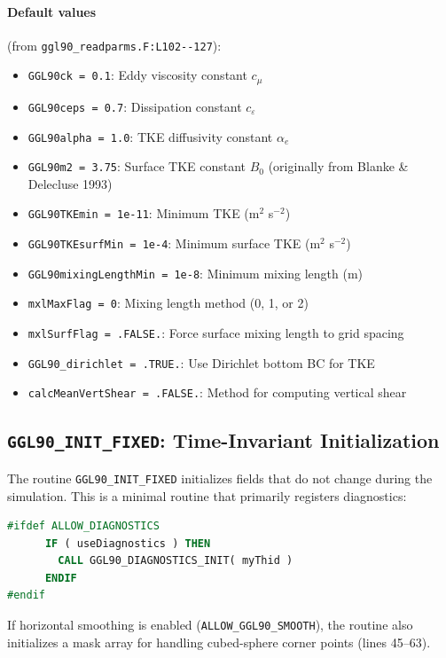 \documentclass[12pt,letterpaper]{article}
\begin{document}
\paragraph{Default values} (from \verb|ggl90_readparms.F:L102--127|):
\begin{itemize}
\item \verb|GGL90ck = 0.1|: Eddy viscosity constant $c_\mu$
\item \verb|GGL90ceps = 0.7|: Dissipation constant $c_\varepsilon$
\item \verb|GGL90alpha = 1.0|: TKE diffusivity constant $\alpha_e$
\item \verb|GGL90m2 = 3.75|: Surface TKE constant $B_0$ (originally from Blanke \& Delecluse 1993)
\item \verb|GGL90TKEmin = 1e-11|: Minimum TKE (m$^2$ s$^{-2}$)
\item \verb|GGL90TKEsurfMin = 1e-4|: Minimum surface TKE (m$^2$ s$^{-2}$)
\item \verb|GGL90mixingLengthMin = 1e-8|: Minimum mixing length (m)
\item \verb|mxlMaxFlag = 0|: Mixing length method (0, 1, or 2)
\item \verb|mxlSurfFlag = .FALSE.|: Force surface mixing length to grid spacing
\item \verb|GGL90_dirichlet = .TRUE.|: Use Dirichlet bottom BC for TKE
\item \verb|calcMeanVertShear = .FALSE.|: Method for computing vertical shear
\end{itemize}

\subsection{\texttt{GGL90\_INIT\_FIXED}: Time-Invariant Initialization}
\label{sec:init_fixed}

The routine \verb|GGL90_INIT_FIXED| initializes fields that do not change during the simulation. This is a minimal routine that primarily registers diagnostics:

\begin{lstlisting}[language=Fortran,caption={(ggl90\_init\_fixed.F:L39--43) Diagnostics registration}]
#ifdef ALLOW_DIAGNOSTICS
      IF ( useDiagnostics ) THEN
        CALL GGL90_DIAGNOSTICS_INIT( myThid )
      ENDIF
#endif
\end{lstlisting}

If horizontal smoothing is enabled (\verb|ALLOW_GGL90_SMOOTH|), the routine also initializes a mask array for handling cubed-sphere corner points (lines 45--63).
\end{document}

